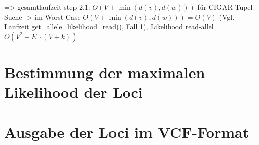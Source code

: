 \begin{itemize}
\end{itemize}
=> gesamtlaufzeit step 2.1: $O(V+\min (d(v), d(w)))$ für CIGAR-Tupel-Suche -> im Worst Case $O(V+\min (d(v), d(w))) = O(V)$ (Vgl. Laufzeit get\_allele\_likelihood\_read(), Fall 1), Likelihood read-allel $O(V^2 + E \, \cdotp (V + k))$

\section{Bestimmung der maximalen Likelihood der Loci} \label{sec:lh_loci}
\subsection{} \label{subsec:}


\section{Ausgabe der Loci im VCF-Format} \label{sec:vcf}
\subsection{} \label{subsec:}
